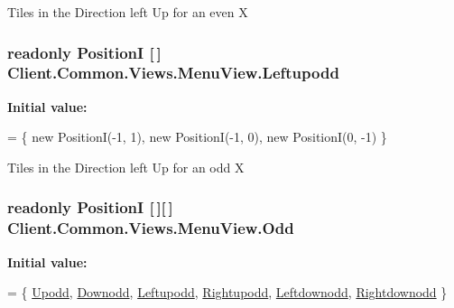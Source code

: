 Tiles in the Direction left Up for an even X 

\hypertarget{classClient_1_1Common_1_1Views_1_1MenuView_abf35d055ec05de9009e4537a25f94739}{}
\subsubsection[{Leftupodd}]{\setlength{\rightskip}{0pt plus 5cm}readonly {\bf Position\+I} \mbox{[}$\,$\mbox{]} Client.\+Common.\+Views.\+Menu\+View.\+Leftupodd\hspace{0.3cm}{\ttfamily [static]}}\label{classClient_1_1Common_1_1Views_1_1MenuView_abf35d055ec05de9009e4537a25f94739}
{\bfseries Initial value\+:}
\begin{DoxyCode}
=
            \{
                \textcolor{keyword}{new} PositionI(-1, 1),
                \textcolor{keyword}{new} PositionI(-1, 0),
                \textcolor{keyword}{new} PositionI(0, -1)
            \}
\end{DoxyCode}


Tiles in the Direction left Up for an odd X 

\hypertarget{classClient_1_1Common_1_1Views_1_1MenuView_a71f02725269d58057f9a0082de655ecb}{}
\subsubsection[{Odd}]{\setlength{\rightskip}{0pt plus 5cm}readonly {\bf Position\+I} \mbox{[}$\,$\mbox{]}\mbox{[}$\,$\mbox{]} Client.\+Common.\+Views.\+Menu\+View.\+Odd\hspace{0.3cm}{\ttfamily [static]}}\label{classClient_1_1Common_1_1Views_1_1MenuView_a71f02725269d58057f9a0082de655ecb}
{\bfseries Initial value\+:}
\begin{DoxyCode}
=
            \{
                \hyperlink{classClient_1_1Common_1_1Views_1_1MenuView_abb38bb872b2393e613c4e9f20498a0b2}{Upodd},
                \hyperlink{classClient_1_1Common_1_1Views_1_1MenuView_aa734ab342ead18ae0c228040de94bf7b}{Downodd},
                \hyperlink{classClient_1_1Common_1_1Views_1_1MenuView_abf35d055ec05de9009e4537a25f94739}{Leftupodd},
                \hyperlink{classClient_1_1Common_1_1Views_1_1MenuView_a4e6fa7548be9f1c327bb97a5447721ff}{Rightupodd},
                \hyperlink{classClient_1_1Common_1_1Views_1_1MenuView_a0a5f7440839d47bbd716627bd0efc576}{Leftdownodd},
                \hyperlink{classClient_1_1Common_1_1Views_1_1MenuView_ab2619bc7970cbbdaeba9521561eabe53}{Rightdownodd}
            \}
\end{DoxyCode}


